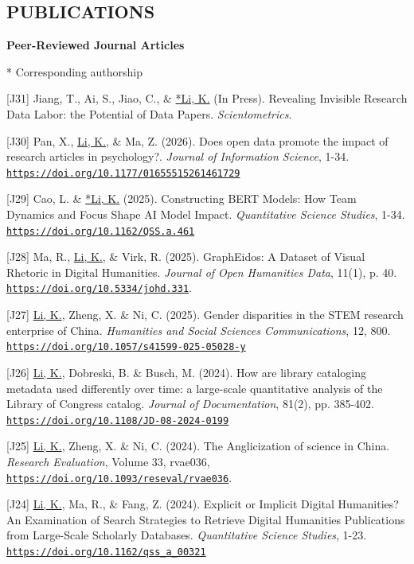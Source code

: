 \documentclass[margin, 10pt]{res} %
\begin{document}
\begin{resume}
\section{PUBLICATIONS}

\textbf{Peer-Reviewed Journal Articles}

* Corresponding authorship

[J31] Jiang, T., Ai, S., Jiao, C., \& \underline{*Li, K.} (In Press). Revealing Invisible Research Data Labor: the Potential of Data Papers. \textit{Scientometrics}.

[J30] Pan, X., \underline{Li, K.}, \& Ma, Z. (2026). Does open data promote the impact of research articles in psychology?. \textit{Journal of Information Science}, 1-34. \href{https://doi.org/10.1177/01655515261461729}{\nolinkurl{https://doi.org/10.1177/01655515261461729}}

[J29] Cao, L. \& \underline{*Li, K.} (2025). Constructing BERT Models: How Team Dynamics and Focus Shape AI Model Impact. \textit{Quantitative Science Studies}, 1-34. \href{https://doi.org/10.1162/QSS.a.461}{\nolinkurl{https://doi.org/10.1162/QSS.a.461}}

[J28] Ma, R., \underline{Li, K.}, \& Virk, R. (2025). GraphEidos: A Dataset of Visual Rhetoric in Digital Humanities. \textit{Journal of Open Humanities Data}, 11(1), p. 40. \href{https://doi.org/10.5334/johd.331}{\nolinkurl{https://doi.org/10.5334/johd.331}}.

[J27] \underline{Li, K.}, Zheng, X. \& Ni, C. (2025). Gender disparities in the STEM research enterprise of China. \textit{Humanities and Social Sciences Communications}, 12, 800. \href{https://doi.org/10.1057/s41599-025-05028-y}{\nolinkurl{https://doi.org/10.1057/s41599-025-05028-y}}

[J26] \underline{Li, K.}, Dobreski, B. \& Busch, M. (2024). How are library cataloging metadata used differently over time: a large-scale quantitative analysis of the Library of Congress catalog. \textit{Journal of Documentation}, 81(2), pp. 385-402. \href{https://doi.org/10.1108/JD-08-2024-0199}{\nolinkurl{https://doi.org/10.1108/JD-08-2024-0199}}

[J25] \underline{Li, K.}, Zheng, X. \& Ni, C. (2024). The Anglicization of science in China. \textit{Research Evaluation}, Volume 33, rvae036, \href{https://doi.org/10.1093/reseval/rvae036}{\nolinkurl{https://doi.org/10.1093/reseval/rvae036}}.

[J24] \underline{Li, K.}, Ma, R., \& Fang, Z. (2024). Explicit or Implicit Digital Humanities? An Examination of Search Strategies to Retrieve Digital Humanities Publications from Large-Scale Scholarly Databases. \textit{Quantitative Science Studies}, 1-23. \href{https://doi.org/10.1162/qss_a_00321}{\nolinkurl{https://doi.org/10.1162/qss_a_00321}}


\end{resume}
\end{document}

